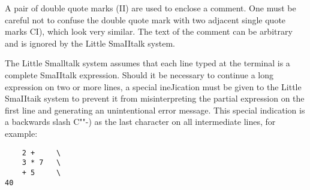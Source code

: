 
A pair of double quote marks (II) are used to enclose a comment. One
must be careful not to confuse the double quote mark with two adjacent
single quote marks CI), which look very similar. The text of the comment
can be arbitrary and is ignored by the Little SmaIItalk system.

The Little Smalltalk system assumes that each line typed at the terminal
is a complete SmaIItalk expression. Should it be necessary to continue a
long expression on two or more lines, a special ineJication must be given
to the Little SmaIItaik system to prevent it from misinterpreting the partial
expression on the first line and generating an unintentional error message.
This special indication is a backwards slash C""-) as the last character on
all intermediate lines, for example:
\begin{lstlisting}
    2 +     \
    3 * 7   \
    + 5     \
40
\end{lstlisting}
